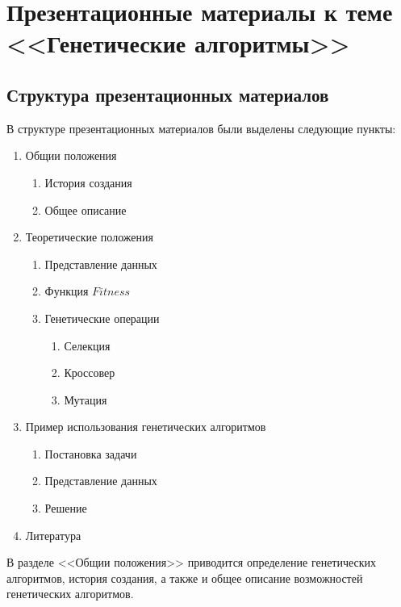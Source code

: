 \documentclass[a4paper, 14pt]{extreport}
\begin{document}
    \newpage

    \chapter{Презентационные материалы к теме <<Генетические алгоритмы>>}
    \section{Структура презентационных материалов}
    В структуре презентационных материалов были выделены следующие пункты:
    \begin{enumerate}
        \item Общии положения
        \begin{enumerate}
            \item История создания
            \item Общее описание
        \end{enumerate}
        \item Теоретические положения
        \begin{enumerate}
            \item Представление данных
            \item Функция \( Fitness \)
            \item Генетические операции
            \begin{enumerate}
                \item Селекция
                \item Кроссовер
                \item Мутация
            \end{enumerate}
        \end{enumerate}
        \item Пример использования генетических алгоритмов
        \begin{enumerate}
            \item Постановка задачи
            \item Представление данных
            \item Решение
        \end{enumerate}
        \item Литература
    \end{enumerate}

    \newpage

    В разделе <<Общии положения>> приводится определение генетических алгоритмов, история создания, а также и общее
    описание возможностей генетических алгоритмов.
\end{document}

